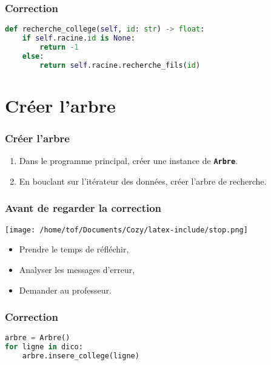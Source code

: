 \documentclass[svgnames,11pt]{beamer}
\begin{document}
    \begin{frame}[fragile]
        \frametitle{Correction}
    
    \begin{center}
    \begin{lstlisting}[language=Python , basicstyle=\ttfamily\small, xleftmargin=2em, xrightmargin=0em]
def recherche_college(self, id: str) -> float:
    if self.racine.id is None:
        return -1
    else:
        return self.racine.recherche_fils(id)
\end{lstlisting}
    \end{center}   
    
    \end{frame}
\section{Créer l'arbre}
\begin{frame}
    \frametitle{Créer l'arbre}

    \begin{activite}
    \begin{enumerate}
        \item Dans le programme principal, créer une instance de \textbf{\texttt{Arbre}}.
        \item En bouclant sur l'itérateur des données, créer l'arbre de recherche.
    \end{enumerate}
    \end{activite}

\end{frame}
\begin{frame}
    \frametitle{Avant de regarder la correction}
\begin{center}
    \centering
    \texttt{[image: /home/tof/Documents/Cozy/latex-include/stop.png]}
    \end{center}
{\Large
    \begin{itemize}
        \item Prendre le temps de réfléchir,
        \item Analyser les messages d'erreur,
        \item Demander au professeur.
    \end{itemize}
}
\end{frame}
\begin{frame}[fragile]
    \frametitle{Correction}

\begin{center}
\begin{lstlisting}[language=Python , basicstyle=\ttfamily\small, xleftmargin=2em, xrightmargin=2em]
arbre = Arbre()
for ligne in dico:
    arbre.insere_college(ligne)
\end{lstlisting}
\end{center}

\end{frame}
\end{document}
